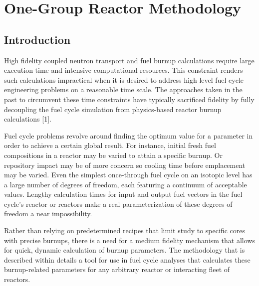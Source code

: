 \chapter{One-Group Reactor Methodology}
\label{1g_paper}



\section{Introduction}
\label{1g_sec:intro}
High fidelity coupled neutron transport and fuel burnup calculations require large execution time and intensive computational resources.  This constraint renders such calculations impractical when it is desired to address high level fuel cycle engineering problems on a reasonable time scale.  The approaches taken in the past to circumvent these time constraints have typically sacrificed fidelity by fully decoupling the fuel cycle simulation from physics-based reactor burnup calculations [1].  

Fuel cycle problems revolve around finding the optimum value for a parameter in order to achieve a certain global result.  For instance, initial fresh fuel compositions in a reactor may be varied to attain a specific burnup. Or repository impact may be of more concern so cooling time before emplacement may be varied.  Even the simplest once-through fuel cycle on an isotopic level has a large number of degrees of freedom, each featuring a continuum of acceptable values.  Lengthy calculation times for input and output fuel vectors in the fuel cycle’s reactor or reactors make a real parameterization of these degrees of freedom a near impossibility.  

Rather than relying on predetermined recipes that limit study to specific cores with precise burnups, there is a need for a medium fidelity mechanism that allows for quick, dynamic calculation of burnup parameters.  The methodology that is described within details a tool for use in fuel cycle analyses that calculates these burnup-related parameters for any arbitrary reactor or interacting fleet of reactors.

